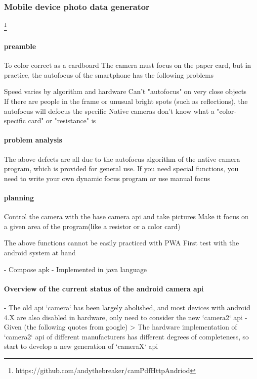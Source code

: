 \documentclass{article}
\begin{document}
\subsubsection{Mobile device photo data generator}
\footnote{https://github.com/andythebreaker/camPdfHttpAndriod}
\paragraph{preamble}
To color correct as a cardboard
The camera must focus on the paper card, but in practice, the autofocus of the smartphone has the following problems

Speed varies by algorithm and hardware
Can't "autofocus" on very close objects
If there are people in the frame or unusual bright spots (such as reflections), the autofocus will defocus the specific
Native cameras don't know what a "color-specific card" or "resistance" is

\paragraph{problem analysis}

The above defects are all due to the autofocus algorithm of the native camera program, which is provided for general use.
If you need special functions, you need to write your own dynamic focus program or use manual focus

\paragraph{planning}

Control the camera with the base camera api
and take pictures
Make it focus on a given area of the program(like a resistor or a color card)

The above functions cannot be easily practiced with PWA
First test with the android system at hand

- Compose apk
- Implemented in java language

\paragraph{Overview of the current status of the android camera api}

- The old api `camera` has been largely abolished, and most devices with android 4.X are also disabled in hardware, only need to consider the new `camera2` api
- Given (the following quotes from google)
> The hardware implementation of `camera2` api of different manufacturers has different degrees of completeness, so start to develop a new generation of `cameraX` api
\end{document}
